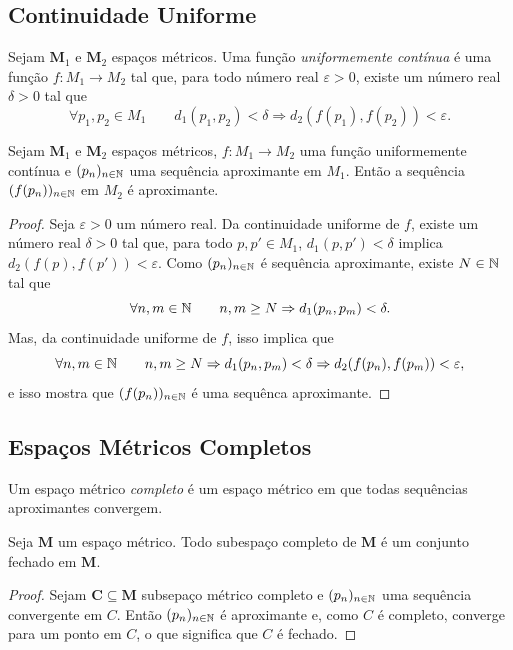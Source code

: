 \subsection{Continuidade Uniforme}

\begin{defi}
Sejam $\bm M_1$ e $\bm M_2$ espaços métricos. Uma função \emph{uniformemente contínua} é uma função $f: M_1 \to M_2$ tal que, para todo número real $\varepsilon > 0$, existe um número real $\delta > 0$ tal que
	\begin{equation*}
	\forall p_1,p_2 \in M_1 \qquad d_1(p_1,p_2) < \delta \Rightarrow d_2(f(p_1),f(p_2)) < \varepsilon.
	\end{equation*}
\end{defi}

\begin{prop}
Sejam $\bm M_1$ e $\bm M_2$ espaços métricos, $f: M_1 \to M_2$ uma função uniformemente contínua e $(p_n)_{n \in \mathbb{N}}$ uma sequência aproximante em $M_1$. Então a sequência $(f(p_n))_{n \in \mathbb{N}}$ em $M_2$ é aproximante.
\end{prop}
\begin{proof}
Seja $\varepsilon > 0$ um número real. Da continuidade uniforme de $f$, existe um número real $\delta > 0$ tal que, para todo $p,p' \in M_1$, $d_1(p,p') < \delta$ implica $d_2(f(p),f(p')) < \varepsilon$. Como $(p_n)_{n \in \mathbb{N}}$ é sequência aproximante, existe $N \in \mathbb{N}$ tal que
	\begin{equation*}
	\forall n,m \in \mathbb{N} \qquad n,m \geq N \Rightarrow d_1(p_n,p_m) < \delta.
	\end{equation*}
Mas, da continuidade uniforme de $f$, isso implica que
	\begin{equation*}
	\forall n,m \in \mathbb{N} \qquad n,m \geq N \Rightarrow d_1(p_n,p_m) < \delta  \Rightarrow d_2(f(p_n),f(p_m)) < \varepsilon,
	\end{equation*}
e isso mostra que $(f(p_n))_{n \in \mathbb{N}}$ é uma sequênca aproximante.
\end{proof}

\subsection{Espaços Métricos Completos}

\begin{defi}
Um espaço métrico \emph{completo} é um espaço métrico em que todas sequências aproximantes convergem.
\end{defi}

\begin{prop}
Seja $\bm M$ um espaço métrico. Todo subespaço completo de $\bm M$ é um conjunto fechado em $\bm M$.
\end{prop}
\begin{proof}
Sejam $\bm C \subseteq \bm M$ subsepaço métrico completo e $(p_n)_{n \in \mathbb{N}}$ uma sequência convergente em $C$. Então $(p_n)_{n \in \mathbb{N}}$ é aproximante e, como $C$ é completo, converge para um ponto em $C$, o que significa que $C$ é fechado.
\end{proof}

